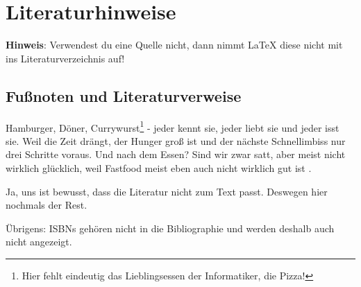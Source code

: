 \chapter{Literaturhinweise}

\textbf{Hinweis}: Verwendest du eine Quelle nicht, dann nimmt \LaTeX{} diese nicht mit ins Literaturverzeichnis auf!

\section{Fußnoten und Literaturverweise}
Hamburger, Döner, Currywurst\footnote{Hier fehlt eindeutig das Lieblingsessen der Informatiker, die Pizza!} - jeder kennt sie, jeder liebt sie und jeder isst sie.
Weil die Zeit drängt\cite{Bonnen.2016}, der Hunger groß ist und der nächste Schnellimbiss\cite{Forsthuber.2016} nur drei Schritte voraus. Und nach dem Essen?
Sind wir zwar satt, aber meist nicht wirklich glücklich, weil Fastfood\cite{Friedl.2017} meist eben auch nicht wirklich gut ist \cite{Kuhnlein.2016}.

Ja, uns ist bewusst, dass die Literatur nicht zum Text passt.
Deswegen hier nochmals der Rest.\cite{Mukherjee.2017, Preuss.2017, Schell.2017, Smith.2017, Visser.2017, Zaidi.2017, o.V..o.J.}

Übrigens: \acfp{ISBN} gehören nicht in die Bibliographie und werden deshalb auch nicht angezeigt.
